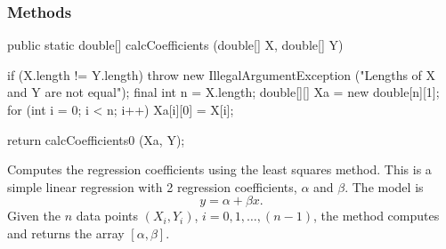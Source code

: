 \begin{code}
\begin{hide}
{{{         for (int j = 0; j < k; j++) {
            // solve S*p = g for p;  S is a diagonal matrix
            double x = S.getQuick(j, j);
            if (x > 0.) {
               x = g.getQuick(j) / x;   // p[j] = g[j]/S[j]
               g.setQuick(j, x);        // overwrite g by p
            } else
               g.setQuick(j, 0.);
         }
         DoubleMatrix1D beta = alg.mult(V, g);   // V*p
         return beta.toArray();
      }
} \end{hide}
\end{code}


\subsubsection* {Methods}

\begin{code}

   public static double[] calcCoefficients (double[] X, double[] Y)\begin{hide} {
      if (X.length != Y.length)
         throw new IllegalArgumentException ("Lengths of X and Y are not equal");
      final int n = X.length;
      double[][] Xa = new double[n][1];
      for (int i = 0; i < n; i++)
         Xa[i][0] = X[i];

      return calcCoefficients0 (Xa, Y);
   }\end{hide}
\end{code}
\begin{tabb} Computes the regression coefficients using the
least squares method. This is a simple linear regression with
 2 regression coefficients, $\alpha$ and $\beta$. The model is
\[
   y = \alpha + \beta x.
\]
Given the $n$ data points $(X_i, Y_i)$, $i=0,1,\ldots,(n-1)$,
 the method computes and returns the array
$[\alpha, \beta]$.
\end{tabb}
\begin{htmlonly}
\end{htmlonly}
